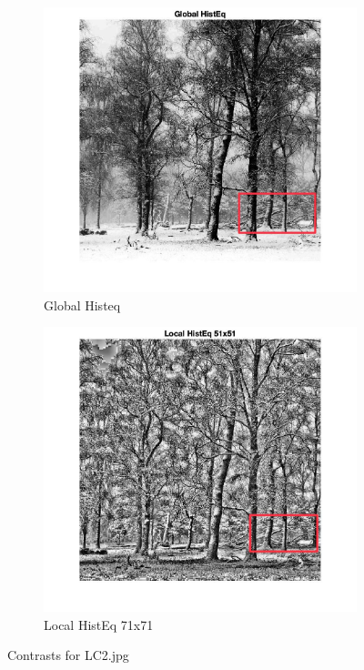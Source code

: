 \documentclass[12pt]{article}
\begin{document}
\begin{figure}[ht]
        \vspace{10pt} %
        
        \begin{subfigure}[b]{0.4\textwidth}
            \centering
            \includegraphics[width=\textwidth]{../images/LC2_globalHistEq_2.jpeg}
            \caption{Global Histeq}
        \end{subfigure}
        \hfill
        \begin{subfigure}[b]{0.4\textwidth}
            \centering
            \includegraphics[width=\textwidth]{../images/LC2_localHistEq_2.jpeg}
            \caption{Local HistEq 71x71}
        \end{subfigure}
    
        \caption{Contrasts for LC2.jpg}
    \end{figure}
\end{document}
